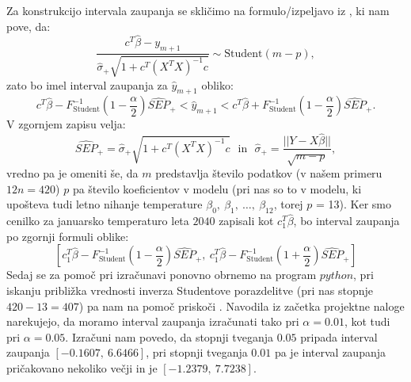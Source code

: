 \documentclass{article}
\begin{document}
Za konstrukcijo intervala zaupanja se skličimo na formulo/izpeljavo iz \cite{lin_reg}, ki nam pove, da:
$$
    \frac{c^T\hat{\beta} - y_{m+1}}{\hat{\sigma}_{+}\sqrt{1 + c^T(X^TX)^{-1}c}} \sim \text{Student}(m-p), 
$$
zato bo imel interval zaupanja za $\hat{y}_{m+1}$ obliko:
$$
    c^T\hat{\beta} - F^{-1}_{\text{Student}}\left(1 - \frac{\alpha}{2}\right)\widehat{SEP}_{+} < \hat{y}_{m+1} < c^T\hat{\beta} + F^{-1}_{\text{Student}}\left(1 - \frac{\alpha}{2}\right)\widehat{SEP}_{+}.
$$
V zgornjem zapisu velja:
$$
\widehat{SEP}_{+}  = \hat{\sigma}_{+}\sqrt{1 + c^T(X^TX)^{-1}c}~~~\text{in}~~~\hat{\sigma}_{+} = \frac{||Y - X\hat{\beta}||}{\sqrt{m - p}},
$$
vredno pa je omeniti še, da $m$ predstavlja število podatkov (v našem primeru $12n = 420$) $p$ pa število koeficientov v modelu (pri nas so to v modelu, ki upošteva tudi letno nihanje temperature $\beta_0,~\beta_1,~\dots,~\beta_{12}$, torej $p$ = 13).
\newline
Ker smo cenilko za januarsko temperaturo leta $2040$ zapisali kot $c_1^T \hat{\beta}$, bo interval zaupanja po zgornji formuli oblike:
$$
\left[c_1^T\hat{\beta} - F^{-1}_{\text{Student}}\left(1 - \frac{\alpha}{2}\right)\widehat{SEP}_{+} ,~c_1^T\hat{\beta} - F^{-1}_{\text{Student}}\left(1 + \frac{\alpha}{2}\right)\widehat{SEP}_{+} \right]
$$
Sedaj se za pomoč pri izračunavi ponovno obrnemo na program $python$, pri iskanju približka vrednosti inverza Studentove porazdelitve (pri nas stopnje $420 - 13 = 407$) pa nam na pomoč priskoči \cite{student}. 
Navodila iz začetka projektne naloge narekujejo, da moramo interval zaupanja izračunati tako pri $\alpha = 0.01$, kot tudi pri $\alpha = 0.05$. 
Izračuni nam povedo, da stopnji tveganja $0.05$ pripada interval zaupanja $[-0.1607,~6.6466]$, pri stopnji tveganja $0.01$ pa je interval zaupanja pričakovano nekoliko večji in je $[-1.2379,~7.7238]$.
\end{document}
